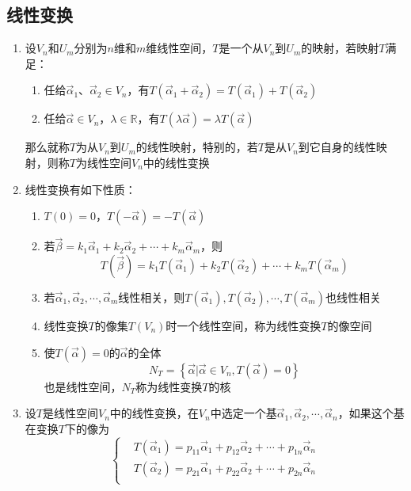 \documentclass[12pt,a4paper,UTF8]{book}
\begin{document}
\subsection{线性变换}
\begin{enumerate}
\item 设$V_n$和$U_m$分别为$n$维和$m$维线性空间，$T$是一个从$V_n$到$U_m$的映射，若映射$T$满足：
\begin{enumerate}
\item 任给$\vec{\alpha}_1$、$\vec{\alpha}_2\in V_n$，有$T\left(\vec{\alpha}_1+\vec{\alpha}_2\right)=T\left(\vec{\alpha}_1\right)+T\left(\vec{\alpha}_2\right)$
\item 任给$\vec{\alpha}\in V_n$，$\lambda\in\mathbb{R}$，有$T\left(\lambda\vec{\alpha}\right)=\lambda T\left(\vec{\alpha}\right)$
\end{enumerate}
那么就称$T$为从$V_n$到$U_m$的线性映射，特别的，若$T$是从$V_n$到它自身的线性映射，则称$T$为线性空间$V_n$中的线性变换
\item 线性变换有如下性质：
\begin{enumerate}
\item $T\left(0\right)=0$，$T\left(-\vec{\alpha}\right)=-T\left(\vec{\alpha}\right)$
\item 若$\vec{\beta}=k_1\vec{\alpha}_1+k_2\vec{\alpha}_2+\cdots+k_m\vec{\alpha}_m$，则
\[T\left(\vec{\beta}\right)=k_1T\left(\vec{\alpha}_1\right)+k_2T\left(\vec{\alpha}_2\right)+\cdots+k_mT\left(\vec{\alpha}_m\right)\]
\item 若$\vec{\alpha}_1,\vec{\alpha}_2,\cdots,\vec{\alpha}_m$线性相关，则$T\left(\vec{\alpha}_1\right),T\left(\vec{\alpha}_2\right),\cdots,T\left(\vec{\alpha}_m\right)$也线性相关
\item 线性变换$T$的像集$T\left(V_n\right)$时一个线性空间，称为线性变换$T$的像空间
\item 使$T\left(\vec{\alpha}\right)=0$的$\vec{\alpha}$的全体
\[N_T=\left\{\vec{\alpha}|\vec{\alpha}\in V_n,T\left(\vec{\alpha}\right)=0\right\}\]
也是线性空间，$N_T$称为线性变换$T$的核
\end{enumerate}
\item 设$T$是线性空间$V_n$中的线性变换，在$V_n$中选定一个基$\vec{\alpha}_1,\vec{\alpha}_2,\cdots,\vec{\alpha}_n$，如果这个基在变换$T$下的像为
\[\left\{\begin{aligned}
&T\left(\vec{\alpha}_1\right)=p_{11}\vec{\alpha}_1+p_{12}\vec{\alpha}_2+\cdots+p_{1n}\vec{\alpha}_n\\
&T\left(\vec{\alpha}_2\right)=p_{21}\vec{\alpha}_1+p_{22}\vec{\alpha}_2+\cdots+p_{2n}\vec{\alpha}_n\\

\end{aligned}\]
\end{enumerate}
\end{document}
